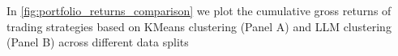 %
%


%

In \cref{fig:portfolio_returns_comparison} we plot the cumulative gross returns of trading strategies based on KMeans clustering (Panel A) and LLM clustering (Panel B) across different data splits

